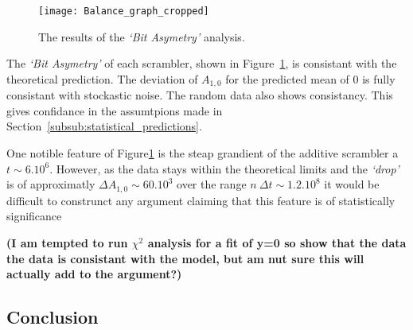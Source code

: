 			\begin{figure}
				\centering
				\texttt{[image: Balance\_graph\_cropped]}
				\caption{The results of the \textit{`Bit Asymetry'} analysis.}
				\label{fig:bit_asym}
			\end{figure}

			The \textit{`Bit Asymetry'} of each scrambler, shown in Figure~\ref{fig:bit_asym}, is consistant with the theoretical prediction. The deviation of $A_{1,0}$ for the predicted mean of 0 is fully consistant with stockastic noise. The random data also shows consistancy. This gives confidance in the assumtpions made in Section~\ref{subsub:statistical_predictions}.
			\par
			One notible feature of Figure\ref{fig:bit_asym} is the steap grandient of the additive scrambler a $t \sim 6.10^6$.
			However, as the data stays within the theoretical limits and the \textit{`drop'} is of approximatly $\Delta A_{1,0} \sim 60.10^3$ over the range $n\ \Delta t \sim 1.2.10^8$ it would be difficult to construnct any argument claiming that this feature is of statistically significance
			\par
			\textbf{(I am tempted to run $\chi^2$ analysis for a fit of y=0 so show that the data the data is consistant with the model, but am nut sure this will actually add to the argument?)}


	\subsection{Conclusion}

